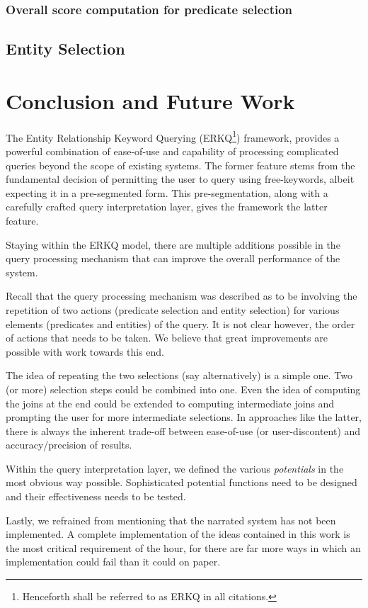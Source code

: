 \documentclass[a4paper, twoside, 12pt]{report}
\begin{document}
\subsection{Overall score computation for predicate selection}

\section{Entity Selection}



\chapter{Conclusion and Future Work}

The Entity Relationship Keyword Querying (ERKQ\footnote{Henceforth shall be referred to as ERKQ in all citations.}) framework, provides a powerful combination of ease-of-use and capability of processing complicated queries beyond the scope of existing systems. The former feature stems from the fundamental decision of permitting the user to query using free-keywords, albeit expecting it in a pre-segmented form. This pre-segmentation, along with a carefully crafted query interpretation layer, gives the framework the latter feature.

Staying within the ERKQ model, there are multiple additions possible in the query processing mechanism that can improve the overall performance of the system. 

Recall that the query processing mechanism was described as to be involving the repetition of two actions (predicate selection and entity selection) for various elements (predicates and entities) of the query. It is not clear however, the order of actions that needs to be taken. We believe that great improvements are possible with work towards this end.

The idea of repeating the two selections (say alternatively) is a simple one. Two (or more) selection steps could be combined into one. Even the idea of computing the joins at the end could be extended to computing intermediate joins and prompting the user for more intermediate selections. In approaches like the latter, there is always the inherent trade-off between ease-of-use (or user-discontent) and accuracy/precision of results.

Within the query interpretation layer, we defined the various \emph{potentials} in the most obvious way possible. Sophisticated potential functions need to be designed and their effectiveness needs to be tested.

Lastly, we refrained from mentioning that the narrated system has not been implemented. A complete implementation of the ideas contained in this work is the most critical requirement of the hour, for there are far more ways in which an implementation could fail than it could on paper.



\end{document}
